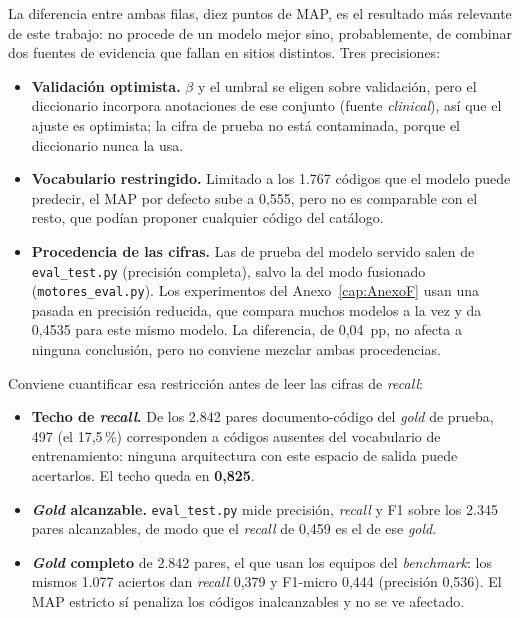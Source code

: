 La diferencia entre ambas filas, diez puntos de MAP, es el resultado más relevante de este trabajo: no procede de un modelo mejor sino, probablemente, de combinar dos fuentes de evidencia que fallan en sitios distintos. Tres precisiones:

\begin{itemize}
 \item \textbf{Validación optimista.} $\beta$ y el umbral se eligen sobre validación, pero el diccionario incorpora anotaciones de ese conjunto (fuente \emph{clinical}), así que el ajuste es optimista; la cifra de prueba no está contaminada, porque el diccionario nunca la usa.
 \item \textbf{Vocabulario restringido.} Limitado a los 1.767 códigos que el modelo puede predecir, el MAP por defecto sube a 0,555, pero no es comparable con el resto, que podían proponer cualquier código del catálogo.
 \item \textbf{Procedencia de las cifras.} Las de prueba del modelo servido salen de \texttt{eval\_test.py} (precisión completa), salvo la del modo fusionado (\texttt{motores\_eval.py}). Los experimentos del Anexo~\ref{cap:AnexoF} usan una pasada en precisión reducida, que compara muchos modelos a la vez y da 0{,}4535 para este mismo modelo. La diferencia, de 0{,}04~pp, no afecta a ninguna conclusión, pero no conviene mezclar ambas procedencias.
\end{itemize}

Conviene cuantificar esa restricción antes de leer las cifras de \emph{recall}:

\begin{itemize}
 \item \textbf{Techo de \emph{recall}.} De los 2.842 pares documento-código del \emph{gold} de prueba, 497 (el 17,5\,\%) corresponden a códigos ausentes del vocabulario de entrenamiento: ninguna arquitectura con este espacio de salida puede acertarlos. El techo queda en \textbf{0,825}.
 \item \textbf{\emph{Gold} alcanzable.} \texttt{eval\_test.py} mide precisión, \emph{recall} y F1 sobre los 2.345 pares alcanzables, de modo que el \emph{recall} de 0,459 es el de ese \emph{gold}.
 \item \textbf{\emph{Gold} completo} de 2.842 pares, el que usan los equipos del \emph{benchmark}: los mismos 1.077 aciertos dan \emph{recall} 0,379 y F1-micro 0,444 (precisión 0,536). El MAP estricto sí penaliza los códigos inalcanzables y no se ve afectado.
\end{itemize}

